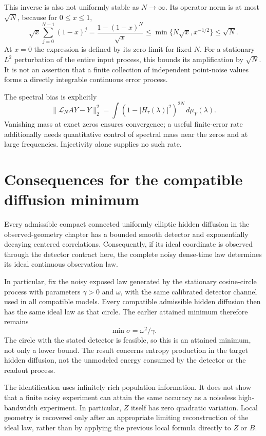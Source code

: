 This inverse is also not uniformly stable as $N\to\infty$. Its operator
norm is at most $\sqrt N$, because for $0\leq x\leq1$,
\[
 \sqrt{x}\sum_{j=0}^{N-1}(1-x)^j
 =\frac{1-(1-x)^N}{\sqrt x}
 \leq\min\{N\sqrt x,x^{-1/2}\}\leq\sqrt N.
\]
At $x=0$ the expression is defined by its zero limit for fixed $N$.
For a stationary $L^2$ perturbation of the entire input process, this bounds
its amplification by $\sqrt N$. It is not an assertion that a finite
collection of independent point-noise values forms a directly integrable
continuous error process.

The spectral bias is explicitly
\[
 \|\mathcal L_N AY-Y\|_2^2
 =\int(1-|H_\tau(\lambda)|^2)^{2N}\,d\mu_Y(\lambda).
\]
Vanishing mass at exact zeros ensures convergence; a useful finite-error
rate additionally needs quantitative control of spectral mass near the
zeros and at large frequencies. Injectivity alone supplies no such rate.

\section{Consequences for the compatible diffusion minimum}

Every admissible compact connected uniformly elliptic hidden diffusion in
the observed-geometry chapter has a bounded smooth detector and exponentially
decaying centered correlations. Consequently, if its ideal coordinate is
observed through the detector contract here, the complete noisy dense-time
law determines its ideal continuous observation law.

In particular, fix the noisy exposed law generated by the stationary
cosine-circle process with parameters $\gamma>0$ and $\omega$, with the
same calibrated detector channel used in all compatible models. Every
compatible admissible hidden diffusion then has the same ideal law as that
circle. The earlier attained minimum therefore remains
\begin{equation}
 \min\sigma=\omega^2/\gamma.
 \label{eq:dg-minimum-preserved}
\end{equation}
The circle with the stated detector is feasible, so this is an attained
minimum, not only a lower bound. The result concerns entropy production in
the target hidden diffusion, not the unmodeled energy consumed by the
detector or the readout process.

The identification uses infinitely rich population information. It does
not show that a finite noisy experiment can attain the same accuracy as a
noiseless high-bandwidth experiment. In particular, $Z$ itself has zero
quadratic variation. Local geometry is recovered only after an appropriate
limiting reconstruction of the ideal law, rather than by applying the
previous local formula directly to $Z$ or $B$.

